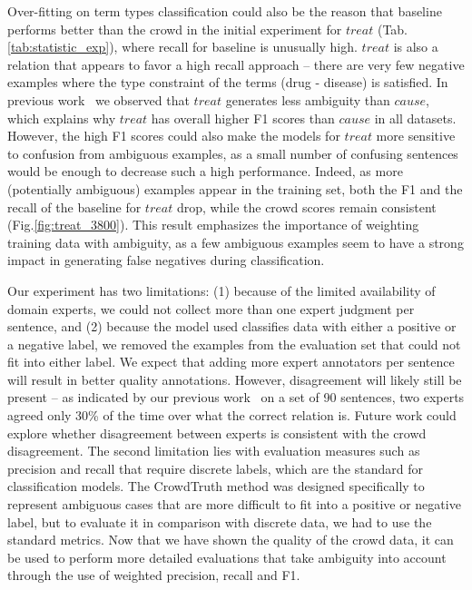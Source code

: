 Over-fitting on term types classification could also be the reason that baseline performs better than the crowd in the initial experiment for $treat$ (Tab.\ref{tab:statistic_exp}), where recall for baseline is unusually high. $treat$ is also a relation that appears to favor a high recall approach -- there are very few negative examples where the type constraint of the terms (drug - disease) is satisfied. In previous work~\cite{aroyo2014threesides} we observed that $treat$ generates less ambiguity than $cause$, which explains why $treat$ has overall higher F1 scores than $cause$ in all datasets. However, the high F1 scores could also make the models for $treat$ more sensitive to confusion from ambiguous examples, as a small number of confusing sentences would be enough to decrease such a high performance. Indeed, as more (potentially ambiguous) examples appear in the training set, both the F1 and the recall of the baseline for $treat$ drop, while the crowd scores remain consistent (Fig.\ref{fig:treat_3800}). This result emphasizes the importance of weighting training data with ambiguity, as a few ambiguous examples seem to have a strong impact in generating false negatives during classification.

Our experiment has two limitations: (1) because of the limited availability of domain experts, we could not collect more than one expert judgment per sentence, and (2) because the model used classifies data with either a positive or a negative label, we removed the examples from the evaluation set that could not fit into either label.  We expect that adding more expert annotators per sentence will result in better quality annotations. However, disagreement will likely still be present -- as indicated by our previous work~\cite{aroyo2013crowd} on a set of 90 sentences, two experts agreed only 30\% of the time over what the correct relation is. Future work could explore whether disagreement between experts is consistent with the crowd disagreement. The second limitation lies with evaluation measures such as precision and recall that require discrete labels, which are the standard for classification models. The CrowdTruth method was designed specifically to represent ambiguous cases that are more difficult to fit into a positive or negative label, but to evaluate it in comparison with discrete data, we had to use the standard metrics. Now that we have shown the quality of the crowd data, it can be used to perform more detailed evaluations that take ambiguity into account through the use of weighted precision, recall and F1.



